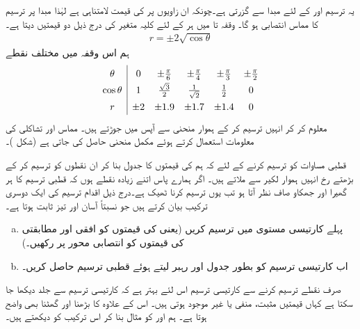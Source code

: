 یہ ترسیم  اور  کے لئے مبدا سے گزرتی ہے۔چونکہ ان زاویوں پر  کی قیمت لامتناہی ہے لہٰذا مبدا پر ترسیم کا مماس انتصابی ہو گا۔ وقفہ  تا  میں ہر  کے لئے  کلیہ  متغیر  کی درج ذیل دو قیمتیں دیتا ہے۔
\begin{align*}
r=\pm 2\sqrt{\cos\theta}
\end{align*}
ہم اس وقفہ میں مختلف نقطے
\begin{align*}
\renewcommand{\arraystretch}{1.4}
\begin{array}{c|ccccc}
\theta&0&\pm\tfrac{\pi}{6}&\pm\tfrac{\pi}{4}&\pm\tfrac{\pi}{3}&\pm\tfrac{\pi}{2}\\
\cos\theta&1&\tfrac{\sqrt{3}}{2}&\tfrac{1}{\sqrt{2}}&\tfrac{1}{2}&0\\
r&\pm 2&\pm 1.9&\pm 1.7&\pm 1.4&0
\end{array}
\end{align*}
 معلوم کر کر انہیں ترسیم کر کے ہموار منحنی سے آپس میں جوڑتے ہیں۔ مماس اور تشاکلی کی معلومات استعمال کرتے ہوئے مکمل منحنی حاصل کی جاتی ہے (شکل )۔ 

قطبی مساوات  کو ترسیم کرنے کے لئے کہ ہم  کی قیمتوں کا جدول بنا کر ان نقطوں کو ترسیم کر کے بڑھتے  رخ انہیں ہموار لکیر سے ملاتے ہیں۔ اگر ہمارے پاس اتنے زیادہ نقطے ہوں کہ قطبی ترسیم کا ہر گھیرا اور جھکاو صاف نظر آتا ہو تب یوں ترسیم کرنا ٹھیک ہے۔درج ذیل اقدام ترسیم کی ایک دوسری ترکیب بیان کرتے ہیں جو نسبتاً آسان اور تیز ثابت ہوتا ہے۔
\begin{enumerate}[a.]
\item
پہلے کارتیسی  مستوی میں  ترسیم کریں (یعنی  کی قیمتوں کو افقی اور مطابقتی  کی قیمتوں کو انتصابی محور پر رکھیں۔) 
\item
اب کارتیسی ترسیم کو بطور جدول اور رہبر  لیتے ہوئے قطبی ترسیم حاصل کریں۔ 
\end{enumerate}

صرف نقطے ترسیم کرنے سے کارتیسی ترسیم اس لئے بہتر ہے کہ کارتیسی ترسیم سے جلد دیکھا جا سکتا ہے کہاں قیمتیں مثبت، منفی یا غیر موجود ہوتی ہیں۔ اس کے علاوہ  کا بڑھنا اور گھٹنا بھی واضح ہوتا ہے۔ ہم  اور  کو مثال بنا کر اس ترکیب کو دیکھتے ہیں۔

